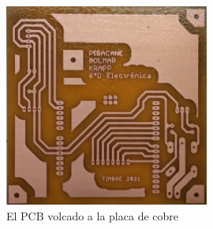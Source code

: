 \documentclass{article}
\begin{document}
\begin{figure}[H]
	\includegraphics[width=0.6\textwidth]{placa_PCB.jpg}
	\centering
	\caption{El PCB volcado a la placa de cobre}
\end{figure}
\end{document}
